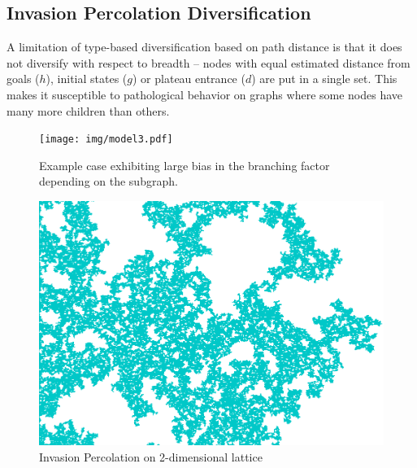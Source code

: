 \subsection{Invasion Percolation Diversification}

A limitation of type-based diversification based on path distance is that it does not diversify with
respect to breadth -- nodes with equal estimated distance from goals ($h$), initial states ($g$) or
plateau entrance ($d$) are put in a single set.  This makes it susceptible to pathological behavior
on graphs where some nodes have many more children than others.


\begin{figure}[hbt]
   \centering
 \begin{minipage}{3.25in}
   \centering
 \texttt{[image: img/model3.pdf]}
 \caption{Example case exhibiting large bias in the branching factor depending on the subgraph.}
 \label{fig:model}
 \end{minipage}
\begin{minipage}{3.25in}
  \centering
 \includegraphics[width=0.5\linewidth]{img/static/ip.png}
 \caption{Invasion Percolation on 2-dimensional lattice}
 \label{fig:ip}
\end{minipage}
\end{figure}

